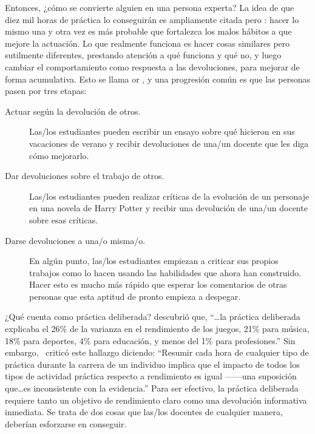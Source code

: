 
Entonces, ¿cómo se convierte alguien en una persona experta?
La idea de que diez mil horas de práctica lo conseguirán es ampliamente citada
pero :
hacer lo mismo una y otra vez es más probable que fortalezca los malos hábitos a que mejore la actuación.
Lo que realmente funciona es hacer cosas similares pero sutilmente diferentes,
prestando atención a qué funciona y qué no,
y luego cambiar el comportamiento como respuesta a las devoluciones, para mejorar de forma acumulativa.
Esto se llama 
or ,
y una progresión común es que las personas pasen por tres etapas:

\begin{description}

\item[Actuar según la devolución de otros.]
  Las/los estudiantes pueden escribir un ensayo sobre qué hicieron en sus vacaciones de verano
  y recibir devoluciones de una/un docente que les diga cómo mejorarlo.

\item[Dar devoluciones sobre el trabajo de otros.]
  Las/los estudiantes pueden realizar críticas de la evolución de un personaje en una novela de Harry Potter
  y recibir una devolución de una/un docente sobre esas críticas.

\item[Darse devoluciones a una/o misma/o.]
  En algún punto,
  las/los estudiantes empiezan a criticar sus propios trabajos como lo hacen
  usando las habilidades que ahora han construido.
  Hacer esto es mucho más rápido que esperar los comentarios de otras personas 
  que esta aptitud de pronto empieza a despegar.

\end{description}

\begin{aside}{¿Qué cuenta como práctica deliberada?}
  \cite{Macn2014} descubrió que,
  ``{\ldots}la práctica deliberada explicaba el 26\% de la varianza en el rendimiento de los juegos,
  21\% para música,
  18\% para deportes,
  4\% para educación,
  y menos del 1\% para profesiones.''
  Sin embargo,~\cite{Eric2016} criticó este hallazgo diciendo:
  ``Resumir cada hora de cualquier tipo de práctica durante la carrera de un individuo
 implica que el impacto de todos los tipos de actividad práctica respecto a rendimiento es igual ------una suposición
  que{\ldots}es inconsistente con la evidencia.''
  Para ser efectivo,
  la práctica deliberada requiere tanto un objetivo de rendimiento claro
  como una devolución informativa inmediata.
  Se trata de dos cosas que las/los docentes de cualquier manera, deberían esforzarse en conseguir.
\end{aside}

